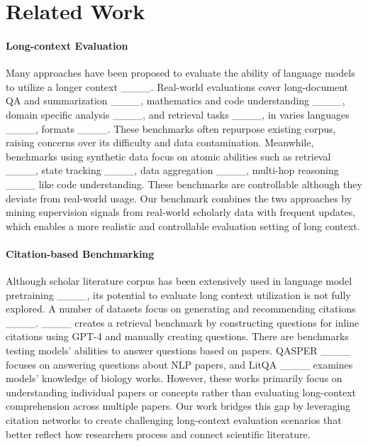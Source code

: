 \section{Related Work}
\label{related_work}

\paragraph{Long-context Evaluation} Many approaches have been proposed to evaluate the ability of language models to utilize a longer context ____. Real-world evaluations cover long-document QA and summarization ____, mathematics and code understanding ____, domain specific analysis ____, and retrieval tasks ____, in varies languages ____, formats ____. 
These benchmarks often repurpose existing corpus, raising concerns over its difficulty and data contamination. Meanwhile, benchmarks using synthetic data focus on atomic abilities such as retrieval ____, state tracking ____, data aggregation ____, multi-hop reasoning ____ like code understanding. These benchmarks are controllable although they deviate from real-world usage. Our benchmark combines the two approaches by mining supervision signals from real-world scholarly data with frequent updates, which enables a more realistic and controllable evaluation setting of long context.    


\paragraph{Citation-based Benchmarking} Although scholar literature corpus has been extensively used in language model pretraining ____, its potential to evaluate long context utilization is not fully explored. A number of datasets focus on generating and recommending citations ____. ____ creates a retrieval benchmark by constructing questions for inline citations using GPT-4 and manually creating questions. There are benchmarks testing models' abilities to answer questions based on papers.  QASPER ____ focuses on answering questions about NLP papers, and LitQA ____ examines models' knowledge of biology works.  However, these works primarily focus on understanding individual papers or concepts rather than evaluating long-context comprehension across multiple papers. Our work bridges this gap by leveraging citation networks to create challenging long-context evaluation scenarios that better reflect how researchers process and connect scientific literature.